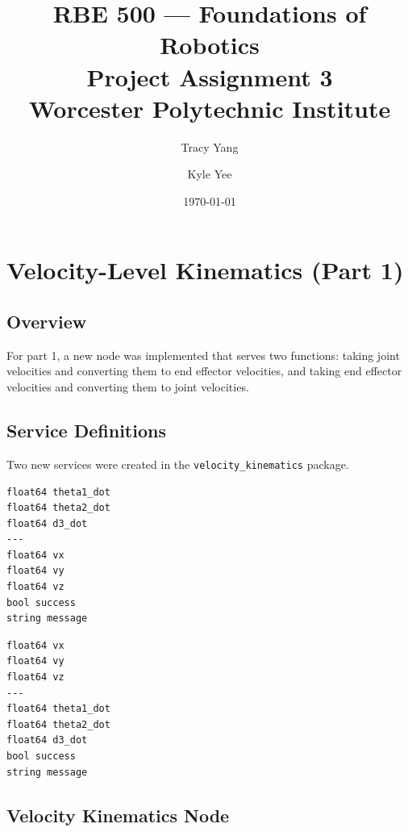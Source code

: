 \documentclass[12pt]{article}
\title{
    \vspace{-1cm}
    \large RBE 500 --- Foundations of Robotics \\[0.4em]
    \LARGE \textbf{Project Assignment 3} \\[0.4em]
    \large Worcester Polytechnic Institute
}
\author{Tracy Yang \and Kyle Yee}
\date{\today}
\begin{document}
\maketitle

\section{Velocity-Level Kinematics (Part 1)}

\subsection{Overview}

For part 1, a new node was implemented that serves two functions: 
taking joint velocities and converting them to end effector velocities, 
and taking end effector velocities and converting them to joint velocities.

\subsection{Service Definitions}

Two new services were created in the \texttt{velocity\_kinematics} package.

\begin{lstlisting}[style=ros, caption={JointToEEVelocity.srv}]
float64 theta1_dot
float64 theta2_dot
float64 d3_dot
---
float64 vx
float64 vy
float64 vz
bool success
string message
\end{lstlisting}

\begin{lstlisting}[style=ros, caption={EEToJointVelocity.srv}]
float64 vx
float64 vy
float64 vz
---
float64 theta1_dot
float64 theta2_dot
float64 d3_dot
bool success
string message
\end{lstlisting}

\subsection{Velocity Kinematics Node}
\end{document}
